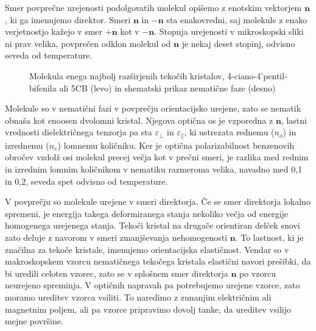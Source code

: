 Smer povprečne urejenosti podolgovatih molekul opišemo z enotskim vektorjem 
$\mathbf{n}$, ki ga imenujemo direktor. Smeri $\mathbf{n}$ in $-\mathbf{n}$ sta 
enakovredni, saj molekule z enako verjetnostjo kažejo v smer $+\mathbf{n}$ kot 
v $-\mathbf{n}$. Stopnja urejenosti v mikroskopski sliki ni prav velika, povprečen
odklon molekul od $\mathbf{n}$ je nekaj deset stopinj, odvisno seveda od temperature.
\begin{figure}[h]
\centering
\def\svgwidth{30truemm} 
\qquad\qquad
\def\svgwidth{50truemm} 

\caption{Molekula enega najbolj razširjenih tekočih kristalov, 4-ciano-4'pentil-bifenila 
ali 5CB (levo) in shematski prikaz nematične faze (desno)}
\label{fig:5CB}
\end{figure}

Molekule so v nematični fazi v povprečju orientacijsko urejene, zato se nematik
obnaša kot enoosen dvolomni kristal. Njegova optična os je vzporedna 
z $\mathbf{n}$, lastni vrednosti dielektričnega tenzorja pa sta $\varepsilon_\bot$ in
$\varepsilon_{\parallel}$, ki ustrezata rednemu ($n_o$) in izrednemu ($n_e$) 
lomnemu količniku.  
Ker je optična polarizabilnost benzenovih obročev vzdolž osi molekul precej večja kot
v prečni smeri, je razlika med rednim in izrednim lomnim količnikom v nematiku razmeroma 
velika, navadno med 0,1 in 0,2, seveda spet odvisno od temperature.

V povprečju so molekule urejene v smeri direktorja. Če se smer direktorja lokalno
spremeni, je energija takega deformiranega 
stanja nekoliko večja od energije homogenega urejenega stanja. Tekoči kristal na
drugače orientiran delček snovi zato deluje z navorom v smeri zmanjševanja 
nehomogenosti $\mathbf{n}$. To lastnost, ki je značilna za tekoče kristale,
imenujemo orientacijska elastičnost. Vendar so v makroskopskem vzorcu
nematičnega tekočega kristala elastični navori prešibki,
da bi uredili celoten vzorec, zato se v splošnem smer direktorja $\mathbf{n}$ 
po vzorcu neurejeno spreminja. V optičnih napravah pa potrebujemo urejene vzorce, zato
moramo ureditev vzorca vsiliti. To naredimo z zunanjim električnim ali magnetnim poljem, 
ali pa vzorce pripravimo dovolj tanke, da ureditev vsilijo mejne površine. 

